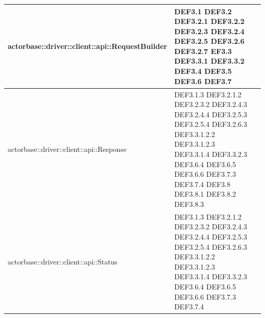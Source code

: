 \documentclass{scalatekids-article}
\begin{document}
\begin{longtable}[H]{|p{12cm}|p{5.5cm}|}
\hline
actorbase::driver::client::api::RequestBuilder & \multiLineCell[t]{DEF3.1 DEF3.2\\DEF3.2.1 DEF3.2.2\\DEF3.2.3 DEF3.2.4\\DEF3.2.5 DEF3.2.6\\DEF3.2.7 EF3.3\\DEF3.3.1 DEF3.3.2\\DEF3.4 DEF3.5\\DEF3.6 DEF3.7\\}\\
\hline
actorbase::driver::client::api::Response & \multiLineCell[t]{DEF3.1.3 DEF3.2.1.2\\DEF3.2.3.2 DEF3.2.4.3\\DEF3.2.4.4 DEF3.2.5.3\\DEF3.2.5.4 DEF3.2.6.3\\DEF3.3.1.2.2 DEF3.3.1.2.3\\DEF3.3.1.4 DEF3.3.2.3\\DEF3.6.4 DEF3.6.5\\DEF3.6.6 DEF3.7.3\\DEF3.7.4 DEF3.8\\DEF3.8.1 DEF3.8.2\\DEF3.8.3}\\
\hline
actorbase::driver::client::api::Status & \multiLineCell[t]{DEF3.1.3 DEF3.2.1.2\\DEF3.2.3.2 DEF3.2.4.3\\DEF3.2.4.4 DEF3.2.5.3\\DEF3.2.5.4 DEF3.2.6.3\\DEF3.3.1.2.2 DEF3.3.1.2.3\\DEF3.3.1.4 DEF3.3.2.3\\DEF3.6.4 DEF3.6.5\\DEF3.6.6 DEF3.7.3\\DEF3.7.4}\\
\hline

\end{longtable}
\end{document}
